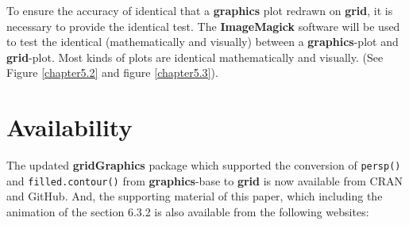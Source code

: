 \documentclass{report}
\begin{document}
To ensure the accuracy of identical that a \textbf{graphics} plot redrawn on \textbf{grid}, it is necessary to provide the identical test. The \textbf{ImageMagick} software will be used to test the identical (mathematically and visually) between a \textbf{graphics}-plot and \textbf{grid}-plot. Most kinds of plots are identical mathematically and visually. (See Figure \ref{chapter5.2} and figure \ref{chapter5.3}).

\section*{Availability}
The updated \textbf{gridGraphics} package which supported the conversion of \texttt{persp()} and \texttt{filled.contour()} from \textbf{graphics}-base to \textbf{grid} is now available from CRAN and GitHub. And, the supporting material of this paper, which including the animation of the section 6.3.2 is also available from the following websites: \\
\begin{center}
     \\
     \\
    \\
\end{center}






\end{document}
